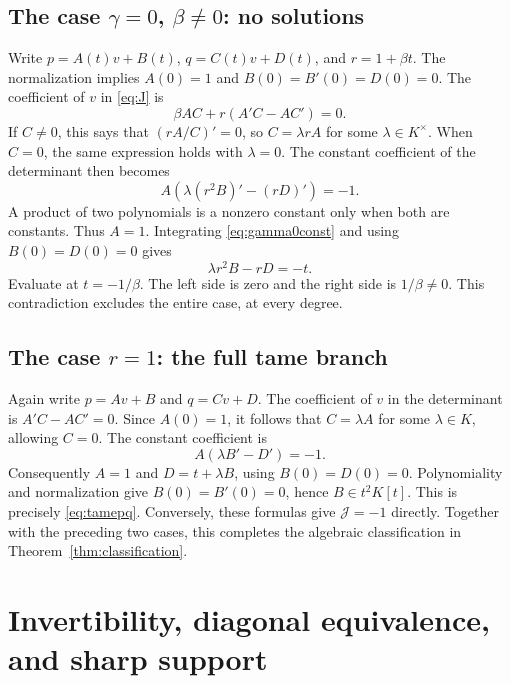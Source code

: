 \documentclass[11pt,a4paper]{article}
\numberwithin{equation}{section}
\theoremstyle{definition}
\theoremstyle{remark}
\newcommand{\J}{\mathcal{J}}
\begin{document}
\subsection{\texorpdfstring{The case $\gamma=0$, $\beta\ne0$: no solutions}{The case gamma zero, beta nonzero: no solutions}}

Write $p=A(t)v+B(t)$, $q=C(t)v+D(t)$, and $r=1+\beta t$. The normalization
implies $A(0)=1$ and $B(0)=B'(0)=D(0)=0$. The coefficient of $v$ in
\eqref{eq:J} is
\begin{equation}\label{eq:gamma0v}
\beta AC+r(A'C-AC')=0.
\end{equation}
If $C\ne0$, this says that $(rA/C)'=0$, so $C=\lambda rA$ for some
$\lambda\in K^\times$. When $C=0$, the same expression holds with
$\lambda=0$. The constant coefficient of the determinant then becomes
\begin{equation}\label{eq:gamma0const}
A\left(\lambda(r^2B)'-(rD)'\right)=-1.
\end{equation}
A product of two polynomials is a nonzero constant only when both are
constants. Thus $A=1$. Integrating \eqref{eq:gamma0const} and using
$B(0)=D(0)=0$ gives
\begin{equation}\label{eq:impossible}
\lambda r^2B-rD=-t.
\end{equation}
Evaluate at $t=-1/\beta$. The left side is zero and the right side is
$1/\beta\ne0$. This contradiction excludes the entire case, at every degree.

\subsection{\texorpdfstring{The case $r=1$: the full tame branch}{The case r=1: the full tame branch}}

Again write $p=Av+B$ and $q=Cv+D$. The coefficient of $v$ in the determinant
is $A'C-AC'=0$. Since $A(0)=1$, it follows that $C=\lambda A$ for some
$\lambda\in K$, allowing $C=0$. The constant coefficient is
\[
A(\lambda B'-D')=-1.
\]
Consequently $A=1$ and $D=t+\lambda B$, using $B(0)=D(0)=0$.
Polynomiality and normalization give $B(0)=B'(0)=0$, hence $B\in t^2K[t]$.
This is precisely \eqref{eq:tamepq}. Conversely, these formulas give
$\J=-1$ directly. Together with the preceding two cases, this completes
the algebraic classification in Theorem~\ref{thm:classification}.

\section{Invertibility, diagonal equivalence, and sharp support}
\label{sec:consequences}
\end{document}
